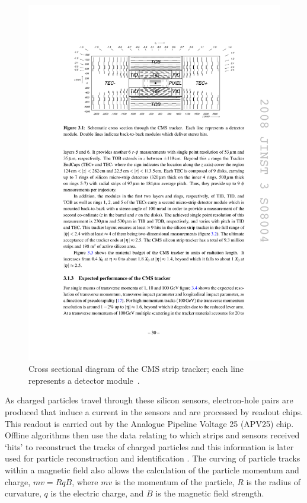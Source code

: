 \begin{figure}[hbtp]
   \centering
     \includegraphics[width=\textwidth]{Chapters/02_Detector/Images/tracker.pdf}\hfill
     \caption[Cross sectional diagram of the CMS strip tracker.]{Cross sectional diagram of the CMS strip
     tracker; each line represents a detector module~\cite{CMS_TDR1}.}
     \label{fig:CMS_strip_tracker}
\end{figure}

As charged particles travel through these silicon sensors, electron-hole pairs are produced that induce a
current in the sensors and are processed by readout chips. This readout is carried out by the Analogue
Pipeline Voltage 25 (APV25) chip. Offline algorithms then use the data relating to which strips and sensors
received `hits' to reconstruct the tracks of charged particles and this information is later used for particle
reconstruction and identification \cite{CMS_experiment,CMS_Tracking_Early_Results}. The curving of particle
tracks within a magnetic field also allows the calculation of the particle momentum and charge, $mv=RqB$,
where $mv$ is the momentum of the particle, $R$ is the radius of curvature, $q$ is the electric charge, and
$B$ is the magnetic field strength.

